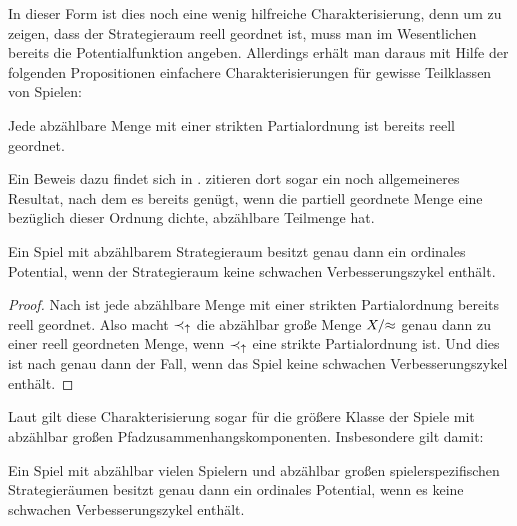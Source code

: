 In dieser Form ist dies noch eine wenig hilfreiche Charakterisierung, denn um zu zeigen, dass der Strategieraum reell geordnet ist, muss man im Wesentlichen bereits die Potentialfunktion angeben. Allerdings erhält man daraus mit Hilfe der folgenden Propositionen einfachere Charakterisierungen für gewisse Teilklassen von Spielen:

\begin{prop}\label{prop:AbzReellGeordnet}
	Jede abzählbare Menge mit einer strikten Partialordnung ist bereits reell geordnet.
\end{prop}

Ein Beweis dazu findet sich in \cite[Lemma 2.2]{CharExOrdPot}. \citeauthor{CharExOrdPot} zitieren dort sogar ein noch allgemeineres Resultat, nach dem es bereits genügt, wenn die partiell geordnete Menge eine bezüglich dieser Ordnung dichte, abzählbare Teilmenge hat.

\begin{kor}\label{kor:CharExOrdPotabzX}
	Ein Spiel mit abzählbarem Strategieraum besitzt genau dann ein ordinales Potential, wenn der Strategieraum keine schwachen Verbesserungszykel enthält.
\end{kor}

\begin{proof}
	Nach  ist jede abzählbare Menge mit einer strikten Partialordnung bereits reell geordnet. Also macht $\prec_\uparrow$ die abzählbar große Menge $X/{\approx}$ genau dann zu einer reell geordneten Menge, wenn $\prec_\uparrow$ eine strikte Partialordnung ist. Und dies ist nach  genau dann der Fall, wenn das Spiel keine schwachen Verbesserungszykel enthält.
\end{proof}

Laut  gilt diese Charakterisierung sogar für die größere Klasse der Spiele mit abzählbar großen Pfadzusammenhangskomponenten. Insbesondere gilt damit:

\begin{kor}\label{kor:CharExOrdPotabzIundXi}
	Ein Spiel mit abzählbar vielen Spielern und abzählbar großen spielerspezifischen Strategieräumen besitzt genau dann ein ordinales Potential, wenn es keine schwachen Verbesserungszykel enthält.
\end{kor}

